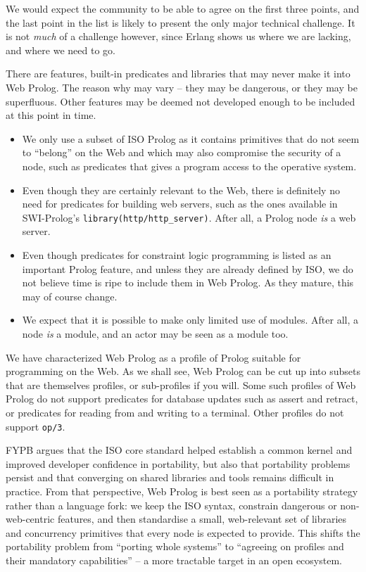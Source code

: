 \noindent We would expect the community to be able to agree on the first three points, and the last point in the list is likely to present the only major technical challenge. It is not \textit{much} of a challenge however, since Erlang shows us where we are lacking, and where we need to go.

There are features, built-in predicates and libraries that may never make it into Web Prolog. The reason why may vary -- they may be dangerous, or they may be superfluous. Other features may be deemed not developed enough to be included at this point in time.

\begin{itemize}

\item We only use a subset of ISO Prolog as it contains primitives that do not seem to ``belong'' on the Web and which may also compromise the security of a node, such as predicates that gives a program access to the operative system.

\item Even though they are certainly relevant to the Web, there is definitely no need for predicates for building web servers, such as the ones available in SWI-Prolog's \texttt{library(http/http\_server)}. After all, a Prolog node \textit{is} a web server.

\item Even though predicates for constraint logic programming is listed as an important Prolog feature, and unless they are already defined by ISO, we do not believe time is ripe to include them in Web Prolog. As they mature, this may of course change.

\item We expect that it is possible to make only limited use of modules. After all, a node \textit{is} a module, and an actor may be seen as a module too.

\end{itemize}

\noindent We have characterized Web Prolog as a profile of Prolog suitable for programming on the Web. As we shall see, Web Prolog can be cut up into subsets that are themselves profiles, or sub-profiles if you will. Some such profiles of Web Prolog do not support predicates for database updates such as assert and retract, or predicates for reading from and writing to a terminal. Other profiles do not support \texttt{op/3}.

\medskip
\noindent FYPB argues that the ISO core standard helped establish a common kernel and improved developer confidence in portability, but also that portability problems persist and that converging on shared libraries and tools remains difficult in practice. From that perspective, Web Prolog is best seen as a portability strategy rather than a language fork: we keep the ISO syntax, constrain dangerous or non-web-centric features, and then standardise a small, web-relevant set of libraries and concurrency primitives that every node is expected to provide. This shifts the portability problem from ``porting whole systems'' to ``agreeing on profiles and their mandatory capabilities'' -- a more tractable target in an open ecosystem.

